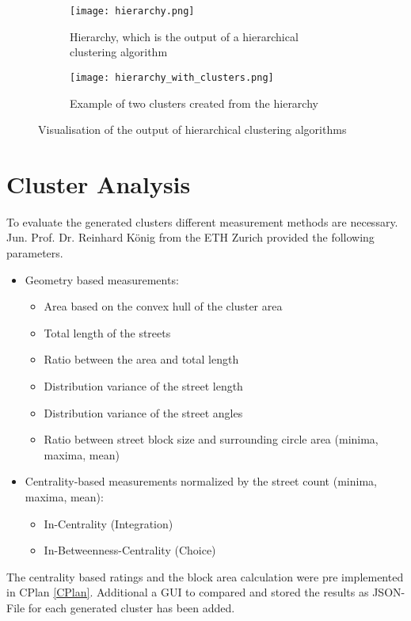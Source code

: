 \begin{figure}[!hb]
    \centering
    \begin{subfigure}[b]{\textwidth}
        \begin{mdframed}[style=border]
            \texttt{[image: hierarchy.png]}
        \end{mdframed}
        \caption{Hierarchy, which is the output of a hierarchical clustering algorithm}
        \label{fig:hierarchy}
    \end{subfigure}
    \par\medskip
    \begin{subfigure}[b]{\textwidth}
        \begin{mdframed}[style=border]
            \texttt{[image: hierarchy\_with\_clusters.png]}
        \end{mdframed}
        \caption{Example of two clusters created from the hierarchy}
        \label{fig:hierarchy_with_clusters}
    \end{subfigure}
    \caption{Visualisation of the output of hierarchical clustering algorithms}
\end{figure}


\section{Cluster Analysis}
\label{sec:clusterRating}
To evaluate the generated clusters different measurement methods are necessary. Jun. Prof. Dr.  Reinhard König from the ETH Zurich provided the following parameters.
\newline
\begin{itemize}
    \item Geometry based measurements:
    \begin{itemize}
        \item Area based on the convex hull of the cluster area
        \item Total length of the streets
        \item Ratio between the area and total length
        \item Distribution variance of the street length
        \item Distribution variance of the street angles
        \item Ratio between street block size and surrounding circle area (minima, maxima, mean)
    \end{itemize}
    \item Centrality-based measurements normalized by the street count (minima, maxima, mean):
    \begin{itemize}
        \item In-Centrality (Integration)
        \item In-Betweenness-Centrality (Choice)
    \end{itemize}
\end{itemize}
The centrality based ratings and the block area calculation were pre implemented in CPlan \ref{CPlan}. Additional a GUI to compared and stored the results as JSON-File for each generated cluster has been added.

